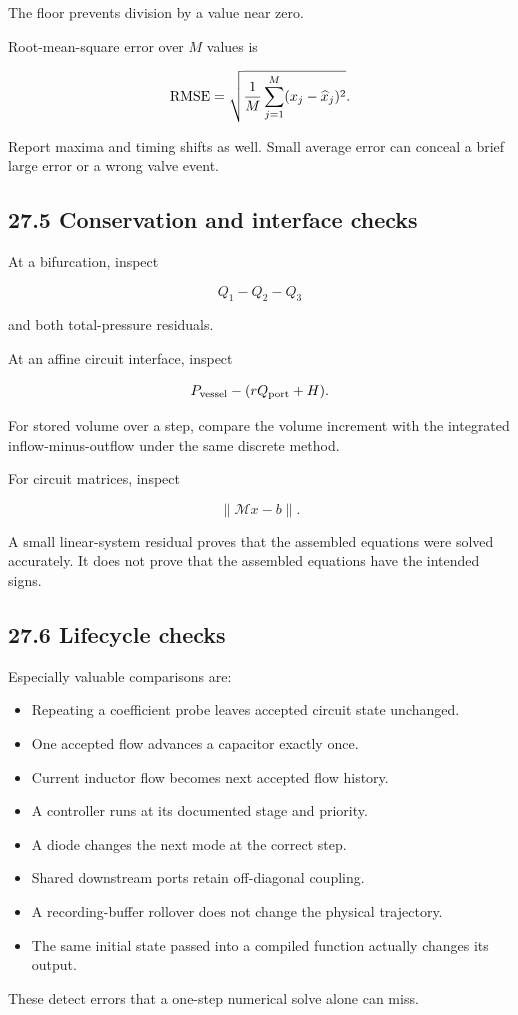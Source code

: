 \documentclass[11pt,a4paper]{article}
\begin{document}
The floor prevents division by a value near zero.

Root-mean-square error over \(M\) values is


\begingroup\small
\[
{\rm RMSE}
=\sqrt{\frac1M\sum_{j=1}^{M}(x_j-\widehat x_j)^2}.
\]
\endgroup


Report maxima and timing shifts as well. Small average error can conceal a brief large error or a wrong valve event.

\subsection{27.5 Conservation and interface checks}
At a bifurcation, inspect


\begingroup\small
\[
Q_1-Q_2-Q_3
\]
\endgroup


and both total-pressure residuals.

At an affine circuit interface, inspect


\begingroup\small
\[
P_{\rm vessel}-(rQ_{\rm port}+H).
\]
\endgroup


For stored volume over a step, compare the volume increment with the integrated inflow-minus-outflow under the same discrete method.

For circuit matrices, inspect


\begingroup\small
\[
\|\mathcal Mx-b\|.
\]
\endgroup


A small linear-system residual proves that the assembled equations were solved accurately. It does not prove that the assembled equations have the intended signs.

\subsection{27.6 Lifecycle checks}
Especially valuable comparisons are:


\begin{itemize}
\item Repeating a coefficient probe leaves accepted circuit state unchanged.


\item One accepted flow advances a capacitor exactly once.


\item Current inductor flow becomes next accepted flow history.


\item A controller runs at its documented stage and priority.


\item A diode changes the next mode at the correct step.


\item Shared downstream ports retain off-diagonal coupling.


\item A recording-buffer rollover does not change the physical trajectory.


\item The same initial state passed into a compiled function actually changes its output.


\end{itemize}
These detect errors that a one-step numerical solve alone can miss.
\end{document}
